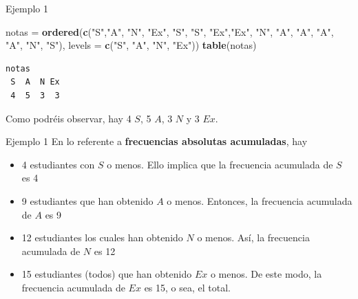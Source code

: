 \documentclass[
  ignorenonframetext,
  aspectratio=169]{beamer}
\newenvironment{Shaded}{\begin{snugshade}}{\end{snugshade}}
\newcommand{\AttributeTok}[1]{\textcolor[rgb]{0.13,0.29,0.53}{#1}}
\newcommand{\FunctionTok}[1]{\textcolor[rgb]{0.13,0.29,0.53}{\textbf{#1}}}
\newcommand{\NormalTok}[1]{#1}
\newcommand{\OtherTok}[1]{\textcolor[rgb]{0.56,0.35,0.01}{#1}}
\newcommand{\StringTok}[1]{\textcolor[rgb]{0.31,0.60,0.02}{#1}}
\providecommand{\tightlist}{%
  \setlength{\itemsep}{0pt}\setlength{\parskip}{0pt}}
\begin{document}
\begin{frame}[fragile]{Ejemplo 1}
\label{ejemplo-1-1}
\begin{Shaded}
\begin{Highlighting}[]
\NormalTok{notas }\OtherTok{=} \FunctionTok{ordered}\NormalTok{(}\FunctionTok{c}\NormalTok{(}\StringTok{"S"}\NormalTok{,}\StringTok{"A"}\NormalTok{, }\StringTok{"N"}\NormalTok{, }\StringTok{"Ex"}\NormalTok{, }\StringTok{"S"}\NormalTok{, }\StringTok{"S"}\NormalTok{,}
                  \StringTok{"Ex"}\NormalTok{,}\StringTok{"Ex"}\NormalTok{, }\StringTok{"N"}\NormalTok{, }\StringTok{"A"}\NormalTok{, }\StringTok{"A"}\NormalTok{, }\StringTok{"A"}\NormalTok{,}
                  \StringTok{"A"}\NormalTok{, }\StringTok{"N"}\NormalTok{, }\StringTok{"S"}\NormalTok{),}
                \AttributeTok{levels =} \FunctionTok{c}\NormalTok{(}\StringTok{"S"}\NormalTok{, }\StringTok{"A"}\NormalTok{, }\StringTok{"N"}\NormalTok{, }\StringTok{"Ex"}\NormalTok{))}
\FunctionTok{table}\NormalTok{(notas)}
\end{Highlighting}
\end{Shaded}

\begin{verbatim}
notas
 S  A  N Ex 
 4  5  3  3 
\end{verbatim}

Como podréis observar, hay 4 \(S\), 5 \(A\), 3 \(N\) y 3 \(Ex\).
\end{frame}

\begin{frame}{Ejemplo 1}
\label{ejemplo-1-2}
En lo referente a \textbf{frecuencias absolutas acumuladas}, hay

\begin{itemize}
\tightlist
\item
  4 estudiantes con \(S\) o menos. Ello implica que la frecuencia
  acumulada de \(S\) es 4
\item
  9 estudiantes que han obtenido \(A\) o menos. Entonces, la frecuencia
  acumulada de \(A\) es 9
\item
  12 estudiantes los cuales han obtenido \(N\) o menos. Así, la
  frecuencia acumulada de \(N\) es 12
\item
  15 estudiantes (todos) que han obtenido \(Ex\) o menos. De este modo,
  la frecuencia acumulada de \(Ex\) es 15, o sea, el total.
\end{itemize}
\end{frame}
\end{document}
